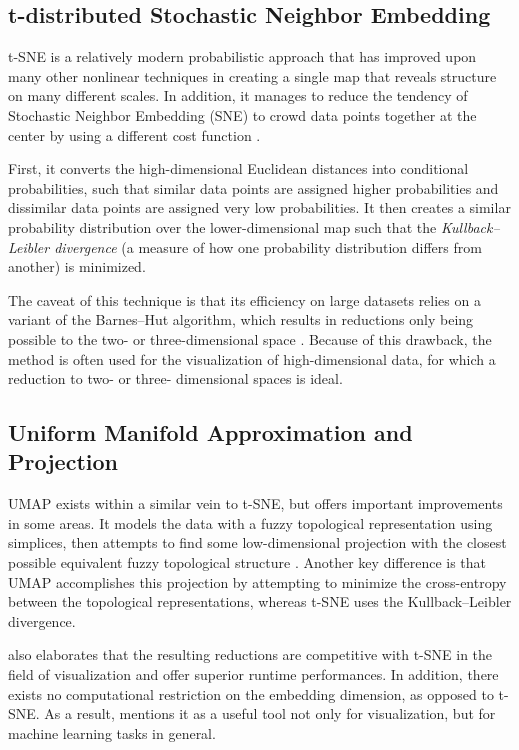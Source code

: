 \documentclass[english,bachelor,ul]{webisthesis} %
\begin{document}
\subsection*{t-distributed Stochastic Neighbor Embedding}

t-SNE is a relatively modern probabilistic approach that has improved upon many other nonlinear techniques in creating a single map that reveals structure on many different scales. In addition, it manages to reduce the tendency of Stochastic Neighbor Embedding (SNE) to crowd data points together at the center by using a different cost function \citep{van2008visualizing}. 

First, it converts the high-dimensional Euclidean distances into conditional probabilities, such that similar data points are assigned higher probabilities and dissimilar data points are assigned very low probabilities. It then creates a similar probability distribution over the lower-dimensional map such that the \textit{Kullback--Leibler divergence} (a measure of how one probability distribution differs from another) is minimized. 

The caveat of this technique is that its efficiency on large datasets relies on a variant of the Barnes--Hut algorithm, which results in reductions only being possible to the two- or three-dimensional space \citep{DBLP:journals/corr/abs-1301-3342}. Because of this drawback, the method is often used for the visualization of high-dimensional data, for which a reduction to two- or three- dimensional spaces is ideal.

\subsection*{Uniform Manifold Approximation and Projection}

UMAP exists within a similar vein to t-SNE, but offers important improvements in some areas. It models the data with a fuzzy topological representation using simplices, then attempts to find some low-dimensional projection with the closest possible equivalent fuzzy topological structure \citep{DBLP:journals/corr/abs-1802-03426}. Another key difference is that UMAP accomplishes this projection by attempting to minimize the cross-entropy between the topological representations, whereas t-SNE uses the Kullback--Leibler divergence. 

\cite{DBLP:journals/corr/abs-1802-03426} also elaborates that the resulting reductions are competitive with t-SNE in the field of visualization and offer superior runtime performances. In addition, there exists no computational restriction on the embedding dimension, as opposed to t-SNE. As a result, \cite{DBLP:journals/corr/abs-1802-03426} mentions it as a useful tool not only for visualization, but for machine learning tasks in general.
\end{document}
